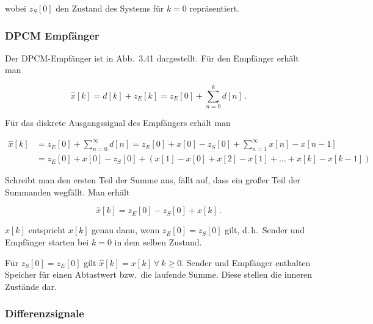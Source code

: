 \begin{beispiel}
wobei $z_S[0]$ den Zustand des Systems für $k = 0$ repräsentiert.

\subsubsection*{DPCM Empfänger}

Der DPCM-Empfänger ist in Abb.\ 3.41 dargestellt. Für den Empfänger erhält man

$$
\widehat{x}[k] = d[k] + z_E[k] = z_E[0] + \sum_{n=0}^{k} d[n]\,.
$$

\begin{center}
\end{center}

Für das diskrete Ausgangssignal des Empfängers erhält man

\begin{align*}
\widehat{x}[k] &= z_E[0] + \sum_{n=0}^{\infty} d[n] = z_E[0] + x[0] - z_S[0] + \sum_{n=1}^{\infty} x[n] - x[n-1] \\
&= z_E[0] + x[0] - z_S[0] + (x[1] - x[0] + x[2] - x[1] + \ldots + x[k] - x[k-1])
\end{align*}

Schreibt man den ersten Teil der Summe aus, fällt auf, dass ein großer Teil der Summanden wegfällt. Man erhält

$$
\widehat{x}[k] = z_E[0] - z_S[0] + x[k]\,.
$$

$\widehat{x}[k]$ entspricht $x[k]$ genau dann, wenn $z_E[0] = z_S[0]$ gilt, d.\,h.\ Sender und Empfänger starten bei $k = 0$ in dem selben Zustand.

Für $z_S[0] = z_E[0]$ gilt $\widehat{x}[k] = x[k]\ \forall\ k \geq 0$. Sender und Empfänger enthalten Speicher für einen Abtastwert bzw.\ die laufende Summe. Diese stellen die inneren Zustände dar.

\subsubsection*{Differenzsignale}


\end{beispiel}

